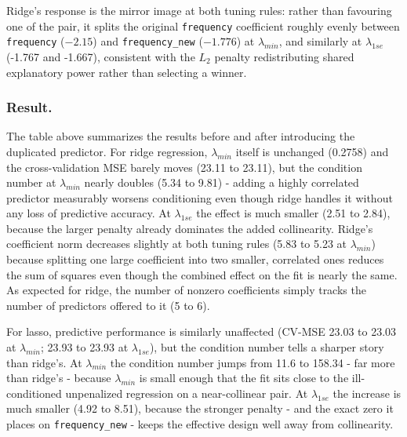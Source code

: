 \documentclass[
  11pt,
]{article}
\begin{document}
Ridge's response is the mirror image at both tuning rules: rather than
favouring one of the pair, it splits the original \texttt{frequency}
coefficient roughly evenly between \texttt{frequency} (\(-2.15\)) and
\texttt{frequency\_new} (\(-1.776\)) at \(\lambda_{min}\), and similarly
at \(\lambda_{1se}\) (-1.767 and -1.667), consistent with the \(L_2\)
penalty redistributing shared explanatory power rather than selecting a
winner.

\subsubsection{Result.}\label{result.}

The table above summarizes the results before and after introducing the
duplicated predictor. For ridge regression, \(\lambda_{min}\) itself is
unchanged (0.2758) and the cross-validation MSE barely moves (23.11 to
23.11), but the condition number at \(\lambda_{min}\) nearly doubles
(5.34 to 9.81) - adding a highly correlated predictor measurably worsens
conditioning even though ridge handles it without any loss of predictive
accuracy. At \(\lambda_{1se}\) the effect is much smaller (2.51 to
2.84), because the larger penalty already dominates the added
collinearity. Ridge's coefficient norm decreases slightly at both tuning
rules (5.83 to 5.23 at \(\lambda_{min}\)) because splitting one large
coefficient into two smaller, correlated ones reduces the sum of squares
even though the combined effect on the fit is nearly the same. As
expected for ridge, the number of nonzero coefficients simply tracks the
number of predictors offered to it (5 to 6).

For lasso, predictive performance is similarly unaffected (CV-MSE 23.03
to 23.03 at \(\lambda_{min}\); 23.93 to 23.93 at \(\lambda_{1se}\)), but
the condition number tells a sharper story than ridge's. At
\(\lambda_{min}\) the condition number jumps from 11.6 to 158.34 - far
more than ridge's - because \(\lambda_{min}\) is small enough that the
fit sits close to the ill-conditioned unpenalized regression on a
near-collinear pair. At \(\lambda_{1se}\) the increase is much smaller
(4.92 to 8.51), because the stronger penalty - and the exact zero it
places on \texttt{frequency\_new} - keeps the effective design well away
from collinearity.
\end{document}
